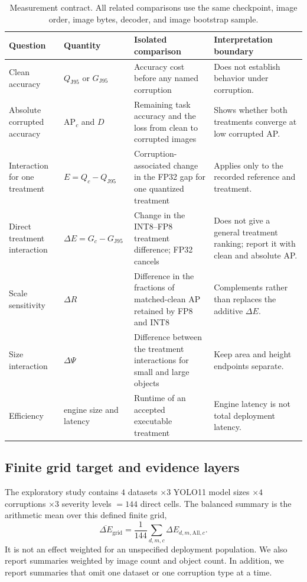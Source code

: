 \documentclass[a4paper,fleqn]{cas-dc}
\newcommand{\AP}{\mathrm{AP}}
\newcommand{\Jclean}{\mathrm{J95}}
\begin{document}
\FloatBarrier
\begin{table}[t]
\centering
\caption{Measurement contract. All related comparisons use the same checkpoint, image order, image bytes, decoder, and image bootstrap sample.}
\label{tab:measurement-contract}
\small
\setlength{\tabcolsep}{4pt}
\begin{tabular}{Y{2.45cm}Y{2.7cm}Y{4.65cm}Y{4.35cm}}
\toprule
Question & Quantity & Isolated comparison & Interpretation boundary \\
\midrule
Clean accuracy & $Q_{\Jclean}$ or $G_{\Jclean}$ & Accuracy cost before any named corruption & Does not establish behavior under corruption. \\
Absolute corrupted accuracy & $\AP_c$ and $D$ & Remaining task accuracy and the loss from clean to corrupted images & Shows whether both treatments converge at low corrupted AP. \\
Interaction for one treatment & $E=Q_c-Q_{\Jclean}$ & Corruption-associated change in the FP32 gap for one quantized treatment & Applies only to the recorded reference and treatment. \\
Direct treatment interaction & $\Delta E=G_c-G_{\Jclean}$ & Change in the INT8--FP8 treatment difference; FP32 cancels & Does not give a general treatment ranking; report it with clean and absolute AP. \\
Scale sensitivity & $\Delta R$ & Difference in the fractions of matched-clean AP retained by FP8 and INT8 & Complements rather than replaces the additive $\Delta E$. \\
Size interaction & $\Delta\Psi$ & Difference between the treatment interactions for small and large objects & Keep area and height endpoints separate. \\
Efficiency & engine size and latency & Runtime of an accepted executable treatment & Engine latency is not total deployment latency. \\
\bottomrule
\end{tabular}
\end{table}

\subsection{Finite grid target and evidence layers}
\label{sec:evidence-layers}

The exploratory study contains $4$ datasets $\times3$ YOLO11 model sizes $\times4$ corruptions $\times3$ severity levels $=144$ direct cells. The balanced summary is the arithmetic mean over this defined finite grid,
\begin{equation}
\overline{\Delta E}_{\mathrm{grid}}=
\frac{1}{144}\sum_{d,m,c}\Delta E_{d,m,\mathrm{All},c}.
\end{equation}
It is not an effect weighted for an unspecified deployment population. We also report summaries weighted by image count and object count. In addition, we report summaries that omit one dataset or one corruption type at a time.
\end{document}
